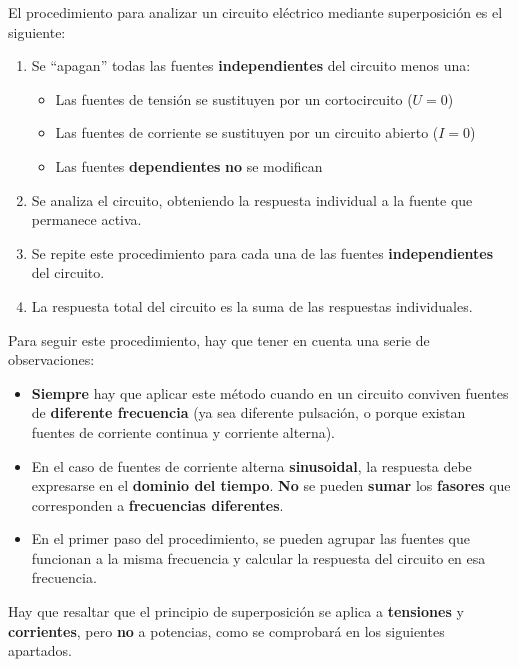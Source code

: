 El procedimiento para analizar un circuito eléctrico mediante
superposición es el siguiente:
\begin{enumerate}
\item Se ``apagan'' todas las fuentes \textbf{independientes} del
  circuito menos una:
  \begin{itemize}
  \item Las fuentes de tensión se sustituyen por un cortocircuito
    ($U = 0$)
  \item Las fuentes de corriente se sustituyen por un circuito abierto
    ($I = 0$)
  \item Las fuentes \textbf{dependientes} \textbf{no} se modifican
  \end{itemize}
\item Se analiza el circuito, obteniendo la respuesta individual a la
  fuente que permanece activa.
\item Se repite este procedimiento para cada una de las fuentes
  \textbf{independientes} del circuito.
\item La respuesta total del circuito es la suma de las respuestas
  individuales.
\end{enumerate}

Para seguir este procedimiento, hay que tener en cuenta una serie de
observaciones:
\begin{itemize}
\item \textbf{Siempre} hay que aplicar este método cuando en un
  circuito conviven fuentes de \textbf{diferente frecuencia} (ya sea
  diferente pulsación, o porque existan fuentes de corriente continua
  y corriente alterna).
\item En el caso de fuentes de corriente alterna \textbf{sinusoidal},
  la respuesta debe expresarse en el \textbf{dominio del
    tiempo}. \textbf{No} se pueden \textbf{sumar} los \textbf{fasores}
  que corresponden a \textbf{frecuencias diferentes}.
\item En el primer paso del procedimiento, se pueden agrupar las
  fuentes que funcionan a la misma frecuencia y calcular la respuesta
  del circuito en esa frecuencia.
\end{itemize}

Hay que resaltar que el principio de superposición se aplica a \textbf{tensiones} y
\textbf{corrientes}, pero \textbf{no} a potencias, como se comprobará en los siguientes apartados.


